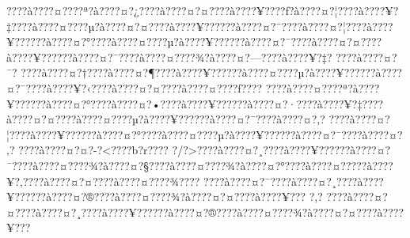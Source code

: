 \documentclass[11pt, openany]{book}
\begin{document}
{{{{{{{{{{{{{{{{{{{{{{{{{{{{{{{{{{{{{{{{{{{{{{{{{{{{{{{{{{{{{{{{{{{{{{{{{{{{{{{{{{{{{{{{{{{{{{{{{{{{{{{{{{{{{???\textbar{}?à???\textbar{}?¤???\textbar{}?ª?à???\textbar{}?¤?¿???\textbar{}?à???\textbar{}?¤?¤???\textbar{}?à???\textbar{}?¥???\textbar{}?ƒ?à???\textbar{}?¤?¦???\textbar{}?à???\textbar{}?¥?‡???\textbar{}?à???\textbar{}?¤???\textbar{}?µ?à???\textbar{}?¤?¤???\textbar{}?à???\textbar{}?¥?????\textbar{}?à???\textbar{}?¤?¯???\textbar{}?à???\textbar{}?¤?¦???\textbar{}?à???\textbar{}?¥?????\textbar{}?à???\textbar{}?¤?°???\textbar{}?à???\textbar{}?¤???\textbar{}?µ?à???\textbar{}?¥?????\textbar{}?à???\textbar{}?¤?¯???\textbar{}?à???\textbar{}?¤?¤???\textbar{}?à???\textbar{}?¥?????\textbar{}?à???\textbar{}?¤?¯???\textbar{}?à???\textbar{}?¤???\textbar{}?¾?à???\textbar{}?¤?---???\textbar{}?à???\textbar{}?¥?‡?
???\textbar{}?à???\textbar{}?¤?¯?
???\textbar{}?à???\textbar{}?¤?†???\textbar{}?à???\textbar{}?¤?¶???\textbar{}?à???\textbar{}?¥?????\textbar{}?à???\textbar{}?¤???\textbar{}?µ?à???\textbar{}?¥?????\textbar{}?à???\textbar{}?¤?¯???\textbar{}?à???\textbar{}?¥?‹???\textbar{}?à???\textbar{}?¤?¤???\textbar{}?à???\textbar{}?¤???\textbar{}?ƒ???\textbar{}?
???\textbar{}?à???\textbar{}?¤???\textbar{}?ª?à???\textbar{}?¥?????\textbar{}?à???\textbar{}?¤?°???\textbar{}?à???\textbar{}?¤?•???\textbar{}?à???\textbar{}?¥?????\textbar{}?à???\textbar{}?¤?·???\textbar{}?à???\textbar{}?¥?‡???\textbar{}?à???\textbar{}?¤?¤???\textbar{}?à???\textbar{}?¤???\textbar{}?µ?à???\textbar{}?¥?????\textbar{}?à???\textbar{}?¤?¯???\textbar{}?à???\textbar{}?¤?‚?
???\textbar{}?à???\textbar{}?¤?¦???\textbar{}?à???\textbar{}?¥?????\textbar{}?à???\textbar{}?¤?°???\textbar{}?à???\textbar{}?¤???\textbar{}?µ?à???\textbar{}?¥?????\textbar{}?à???\textbar{}?¤?¯???\textbar{}?à???\textbar{}?¤?‚?
???\textbar{}?à???\textbar{}?¤?¤?-?\textless{}???\textbar{}?b?r???\textbar{}?
?/?\textgreater{}???\textbar{}?à???\textbar{}?¤?¸???\textbar{}?à???\textbar{}?¥?????\textbar{}?à???\textbar{}?¤?¯???\textbar{}?à???\textbar{}?¤???\textbar{}?¾?à???\textbar{}?¤?§???\textbar{}?à???\textbar{}?¤???\textbar{}?¾?à???\textbar{}?¤?°???\textbar{}?à???\textbar{}?¤?­???\textbar{}?à???\textbar{}?¥?‚???\textbar{}?à???\textbar{}?¤?¤???\textbar{}?à???\textbar{}?¤???\textbar{}?¾???\textbar{}?
???\textbar{}?à???\textbar{}?¤?¯???\textbar{}?à???\textbar{}?¤?¸???\textbar{}?à???\textbar{}?¥?????\textbar{}?à???\textbar{}?¤?®???\textbar{}?à???\textbar{}?¤???\textbar{}?¾?à???\textbar{}?¤?¤???\textbar{}?à???\textbar{}?¥???
?,?
???\textbar{}?à???\textbar{}?¤?¤???\textbar{}?à???\textbar{}?¤?¸???\textbar{}?à???\textbar{}?¥?????\textbar{}?à???\textbar{}?¤?®???\textbar{}?à???\textbar{}?¤???\textbar{}?¾?à???\textbar{}?¤?¤???\textbar{}?à???\textbar{}?¥???
}}}}}}}}}}}}}}}}}}}}}}}}}}}}}}}}}}}}}}}}}}}}}}}}}}}}}}}}}}}}}}}}}}}}}}}}}}}}}}}}}}}}}}}}}}}}}}}}}}}}}}}}}}}}}
\end{document}
